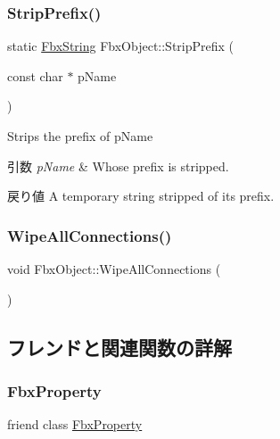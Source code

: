 \subsubsection{\texorpdfstring{Strip\+Prefix()}{StripPrefix()}\hspace{0.1cm}{\footnotesize\ttfamily [2/2]}}
{\footnotesize\ttfamily static \hyperlink{class_fbx_string}{Fbx\+String} Fbx\+Object\+::\+Strip\+Prefix (\begin{DoxyParamCaption}\item[{const char $\ast$}]{p\+Name }\end{DoxyParamCaption})\hspace{0.3cm}{\ttfamily [static]}}

Strips the prefix of p\+Name 
\begin{DoxyParams}{引数}
{\em p\+Name} & Whose prefix is stripped. \\
\hline
\end{DoxyParams}
\begin{DoxyReturn}{戻り値}
A temporary string stripped of its prefix. 
\end{DoxyReturn}
\mbox{\label{class_fbx_object_a57545454bba422674d78b805dca43409}} 
\subsubsection{\texorpdfstring{Wipe\+All\+Connections()}{WipeAllConnections()}}
{\footnotesize\ttfamily void Fbx\+Object\+::\+Wipe\+All\+Connections (\begin{DoxyParamCaption}{ }\end{DoxyParamCaption})}



\subsection{フレンドと関連関数の詳解}
\mbox{\label{class_fbx_object_a5d7018830479ec28905f28575480f88f}} 
\subsubsection{\texorpdfstring{Fbx\+Property}{FbxProperty}}
{\footnotesize\ttfamily friend class \hyperlink{class_fbx_property}{Fbx\+Property}\hspace{0.3cm}{\ttfamily [friend]}}



